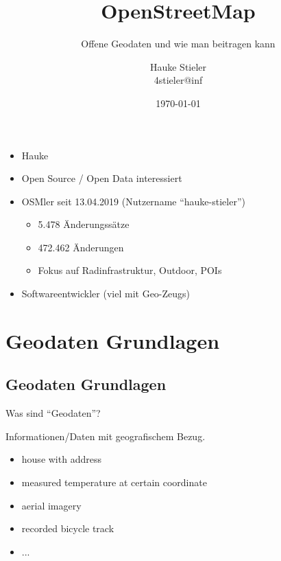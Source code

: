 \documentclass{beamer}
\title{OpenStreetMap}
\subtitle{Offene Geodaten und wie man beitragen kann}
\author{Hauke Stieler\\4stieler@inf}
\date{\today}
\begin{document}
	\maketitle
	
	\begin{frame}
		\begin{itemize}
			\item Hauke
			\item Open Source / Open Data interessiert\pause
			\item OSMler seit 13.04.2019 (Nutzername \enquote{hauke-stieler})
			\begin{itemize}
				\item 5.478 Änderungssätze
				\item 472.462 Änderungen
				\item Fokus auf Radinfrastruktur, Outdoor, POIs
			\end{itemize}\pause
			\item Softwareentwickler (viel mit Geo-Zeugs)
		\end{itemize}
	\end{frame}
	
	\begin{frame}
		\tableofcontents
	\end{frame}
	
	\section{Geodaten Grundlagen}
	
		\subsection{Geodaten Grundlagen}
	
		\begin{frame}{Was sind \enquote{Geodaten}?}
			\begin{definition}
				Informationen/Daten mit geografischem Bezug.
			\end{definition}
			\begin{itemize}
				\item house with address\pause
				\item measured temperature at certain coordinate\pause
				\item aerial imagery\pause
				\item recorded bicycle track\pause
				\item ...
			\end{itemize}
		\end{frame}
		
\end{document}
